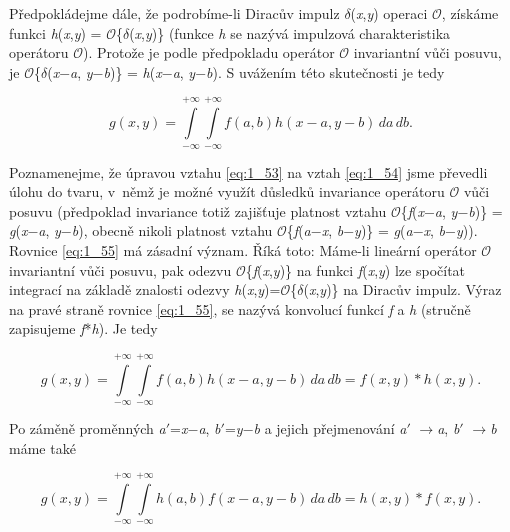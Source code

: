 Předpokládejme dále, že podrobíme-li Diracův impulz $\delta$(\textit{x},\textit{y}) operaci $\mathscr{O}$, získáme funkci \textit{h}(\textit{x},\textit{y}) = $\mathscr{O}$\{$\delta$(\textit{x},\textit{y})\} (funkce \textit{h} se nazývá impulzová charakteristika operátoru $\mathscr{O}$). Protože je podle předpokladu operátor $\mathscr{O}$ invariantní vůči posuvu, je $\mathscr{O}$\{$\delta$(\textit{x}$-$\textit{a}, \textit{y}$-$\textit{b})\} = \textit{h}(\textit{x}$-$\textit{a}, \textit{y}$-$\textit{b}). S uvážením této skutečnosti je tedy

\begin{equation} \label{eq:1_55}
    g(x, y) = \int\limits_{-\infty}^{+\infty} \int\limits_{-\infty}^{+\infty} f(a, b) h(x-a, y-b) \,da \,db.
\end{equation}

Poznamenejme, že úpravou vztahu \eqref{eq:1_53} na vztah \eqref{eq:1_54} jsme převedli úlohu do tvaru, v~němž je možné využít důsledků invariance operátoru $\mathscr{O}$ vůči posuvu (předpoklad invariance totiž zajišťuje platnost vztahu $\mathscr{O}$\{\textit{f}(\textit{x}$-$\textit{a}, \textit{y}$-$\textit{b})\} =  \textit{g}(\textit{x}$-$\textit{a}, \textit{y}$-$\textit{b}), obecně nikoli platnost vztahu $\mathscr{O}$\{\textit{f}(\textit{a}$-$\textit{x}, \textit{b}$-$\textit{y})\} =  \textit{g}(\textit{a}$-$\textit{x}, \textit{b}$-$\textit{y})). Rovnice \eqref{eq:1_55} má zásadní význam. Říká toto: Máme-li lineární operátor $\mathscr{O}$ invariantní vůči posuvu, pak odezvu $\mathscr{O}$\{\textit{f}(\textit{x},\textit{y})\} na funkci \textit{f}(\textit{x},\textit{y}) lze spočítat integrací na základě znalosti odezvy \textit{h}(\textit{x},\textit{y})=$\mathscr{O}$\{$\delta$(\textit{x},\textit{y})\} na Diracův impulz. Výraz na pravé straně rovnice \eqref{eq:1_55}, se nazývá konvolucí funkcí \textit{f} a \textit{h} (stručně zapisujeme \textit{f}*\textit{h}). Je tedy

\begin{equation} \label{eq:1_56}
    g(x, y) = \int\limits_{-\infty}^{+\infty} \int\limits_{-\infty}^{+\infty} f(a, b) h(x-a, y-b) \,da \,db = f(x, y) \ast h(x, y).
\end{equation}

Po záměně proměnných \textit{a}$'$=\textit{x}$-$\textit{a}, \textit{b}$'$=\textit{y}$-$\textit{b} a jejich přejmenování \textit{a}$'$ $\rightarrow$\textit{a}, \textit{b}$'$ $\rightarrow$\textit{b} máme také

\begin{equation} \label{eq:1_57}
    g(x, y) = \int\limits_{-\infty}^{+\infty} \int\limits_{-\infty}^{+\infty} h(a, b) f(x-a, y-b) \,da \,db = h(x, y) \ast f(x, y).
\end{equation}

